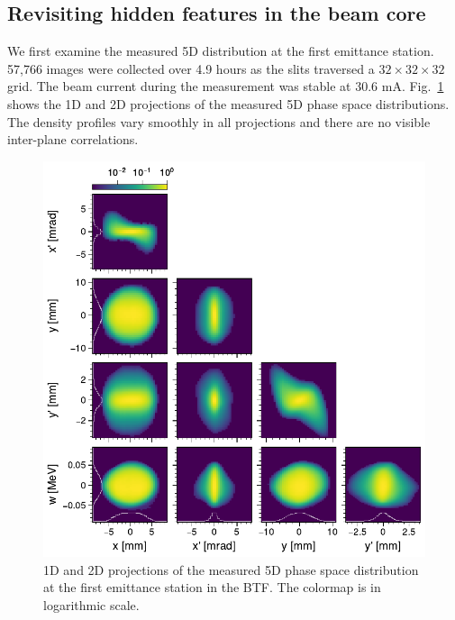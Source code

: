 \documentclass[letterpaper,
               keeplastbox,
               nospread,
               biblatex,
              ]{jacow}
\begin{document}
\subsection{Revisiting hidden features in the beam core}

We first examine the measured 5D distribution at the first emittance station. 57,766 images were collected over 4.9 hours as the slits traversed a $32 \times 32 \times 32$ grid. The beam current during the measurement was stable at 30.6 mA. Fig.~\ref{fig:VS06_corner} shows the 1D and 2D projections of the measured 5D phase space distributions. The density profiles vary smoothly in all projections and there are no visible inter-plane correlations.
%
\begin{figure}[!b] 
    \centering
    \includegraphics[width=\columnwidth]{fig2.pdf}
    \caption{1D and 2D projections of the measured 5D phase space distribution at the first emittance station in the BTF. The colormap is in logarithmic scale.}
    \label{fig:VS06_corner}
\end{figure}
%
\end{document}
